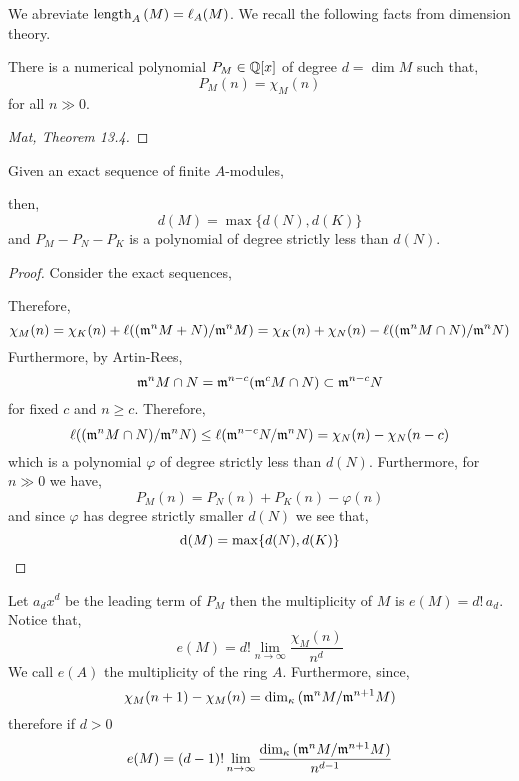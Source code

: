 \documentclass[12pt]{article}
\begin{document}
\begin{rmk}
We abreviate $\mathrm{length}_{A}\left( M \right) = \ell_A(M)$. We recall the following facts from dimension theory.
\end{rmk}

\begin{prop}
There is a numerical polynomial $P_M \in \mathbb{Q}[x]$ of degree $d = \dim{M}$ such that,
\[ P_M(n) = \chi_M(n) \]
for all $n \gg 0$.
\end{prop}

\begin{proof}
[Mat, Theorem 13.4]
\end{proof}

\begin{prop} \label{exactness_samuel_poly}
Given an exact sequence of finite $A$-modules,
\begin{center}
\end{center}
then,
\[ d(M) = \max \{ d(N), d(K) \} \]
and $P_{M} - P_{N} - P_{K}$ is a polynomial of degree strictly less than $d(N)$. 
\end{prop}

\begin{proof}
Consider the exact sequences,
\begin{center}
\end{center}
Therefore,
\[ \chi_M(n) = \chi_K(n) + \ell((\mathfrak{m}^n M + N) / \mathfrak{m}^n M) = \chi_K(n) + \chi_N(n) - \ell((\mathfrak{m}^n M \cap N)/\mathfrak{m}^n N) \]
Furthermore, by Artin-Rees,
\[ \mathfrak{m}^n M \cap N = \mathfrak{m}^{n-c}(\mathfrak{m}^c M \cap N) \subset \mathfrak{m}^{n-c} N \]
for fixed $c$ and $n \ge c$. Therefore,
\[ \ell((\mathfrak{m}^n M \cap N)/\mathfrak{m}^n N) \le \ell(\mathfrak{m}^{n-c} N / \mathfrak{m}^n N) = \chi_N(n) - \chi_N(n-c) \]
which is a polynomial $\varphi$ of degree strictly less than $d(N)$. Furthermore, for $n \gg 0$ we have,
\[ P_M(n) = P_N(n) + P_K(n) - \varphi(n) \]
and since $\varphi$ has degree strictly smaller $d(N)$ we see that,
\[ \mathrm{d}(M) = \max \{ d(N), d(K) \} \]
\end{proof}

\begin{defn}
Let $a_d x^d$ be the leading term of $P_M$ then the multiplicity of $M$ is $e(M) = d! \, a_d$. Notice that,
\[ e(M) = d! \lim_{n \to \infty} \frac{\chi_M(n)}{n^d} \]
We call $e(A)$ the multiplicity of the ring $A$. Furthermore, since,
\[ \chi_M(n+1) - \chi_M(n) = \dim_\kappa{(\mathfrak{m}^n M / \mathfrak{m}^{n+1} M)} \]
therefore if $d > 0$
\[ e(M) = (d-1)! \lim_{n \to \infty} \frac{\dim_\kappa{(\mathfrak{m}^n M / \mathfrak{m}^{n+1} M)}}{n^{d-1}} \]
\end{defn}
\end{document}
